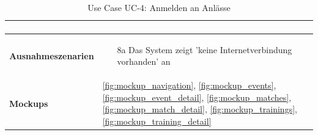 \begin{table}[ht]
\begin{tabular}{ l | p{10cm} }
\begin{enumerate}
					\end{enumerate}
					\\ \hline
	\textbf{Ausnahmeszenarien}&	\begin{enumerate}
					\item[8a] Das System zeigt 'keine Internetverbindung vorhanden' an
					\end{enumerate}
					\\ \hline
	\textbf{Mockups}	 	&	\ref{fig:mockup_navigation}, \ref{fig:mockup_events}, \ref{fig:mockup_event_detail},
					\ref{fig:mockup_matches}, \ref{fig:mockup_match_detail}, \ref{fig:mockup_trainings}, 
					\ref{fig:mockup_training_detail}
  \end{tabular}
   \caption{Use Case UC-4: Anmelden an Anlässe}\label{table:use_case_4}
\end{table}

